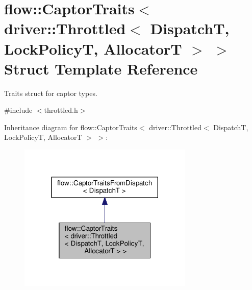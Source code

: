 \hypertarget{structflow_1_1_captor_traits_3_01driver_1_1_throttled_3_01_dispatch_t_00_01_lock_policy_t_00_01_allocator_t_01_4_01_4}{}\section{flow\+:\+:Captor\+Traits$<$ driver\+:\+:Throttled$<$ DispatchT, Lock\+PolicyT, AllocatorT $>$ $>$ Struct Template Reference}
\label{structflow_1_1_captor_traits_3_01driver_1_1_throttled_3_01_dispatch_t_00_01_lock_policy_t_00_01_allocator_t_01_4_01_4}


Traits struct for captor types.  




{\ttfamily \#include $<$throttled.\+h$>$}



Inheritance diagram for flow\+:\+:Captor\+Traits$<$ driver\+:\+:Throttled$<$ DispatchT, Lock\+PolicyT, AllocatorT $>$ $>$\+:\nopagebreak
\begin{figure}[H]
\begin{center}
\leavevmode
\includegraphics[width=236pt]{structflow_1_1_captor_traits_3_01driver_1_1_throttled_3_01_dispatch_t_00_01_lock_policy_t_00_01_70b471ce39f8b035427f21289763f6b2}
\end{center}
\end{figure}


